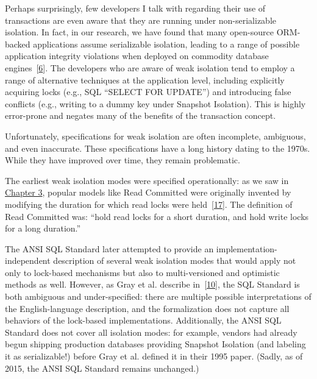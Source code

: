 \documentclass[b5paper,11pt,twoside,openright]{book}
\begin{document}
Perhaps surprisingly, few developers I talk with regarding their use of
transactions are even aware that they are running under non-serializable
isolation. In fact, in our research, we have found that many open-source
ORM-backed applications assume serializable isolation, leading to a
range of possible application integrity violations when deployed on
commodity database engines~{{[}\protect\hyperlink{ref-feral}{6}{]}}. The
developers who are aware of weak isolation tend to employ a range of
alternative techniques at the application level, including explicitly
acquiring locks (e.g., SQL ``SELECT FOR UPDATE'') and introducing false
conflicts (e.g., writing to a dummy key under Snapshot Isolation). This
is highly error-prone and negates many of the benefits of the
transaction concept.

Unfortunately, specifications for weak isolation are often incomplete,
ambiguous, and even inaccurate. These specifications have a long history
dating to the 1970s. While they have improved over time, they remain
problematic.

The earliest weak isolation modes were specified operationally: as we
saw in \hyperref[ch3-techniques]{Chapter 3}, popular models like Read
Committed were originally invented by modifying the duration for which
read locks were held~{{[}\protect\hyperlink{ref-gray-isolation}{17}{]}}.
The definition of Read Committed was: ``hold read locks for a short
duration, and hold write locks for a long duration.''

The ANSI SQL Standard later attempted to provide an
implementation-independent description of several weak isolation modes
that would apply not only to lock-based mechanisms but also to
multi-versioned and optimistic methods as well. However, as Gray et al.
describe in~{{[}\protect\hyperlink{ref-ansi-critique}{10}{]}}, the SQL
Standard is both ambiguous and under-specified: there are multiple
possible interpretations of the English-language description, and the
formalization does not capture all behaviors of the lock-based
implementations. Additionally, the ANSI SQL Standard does not cover all
isolation modes: for example, vendors had already begun shipping
production databases providing Snapshot Isolation (and labeling it as
serializable!) before Gray et al. defined it in their 1995 paper.
(Sadly, as of 2015, the ANSI SQL Standard remains unchanged.)
\end{document}
